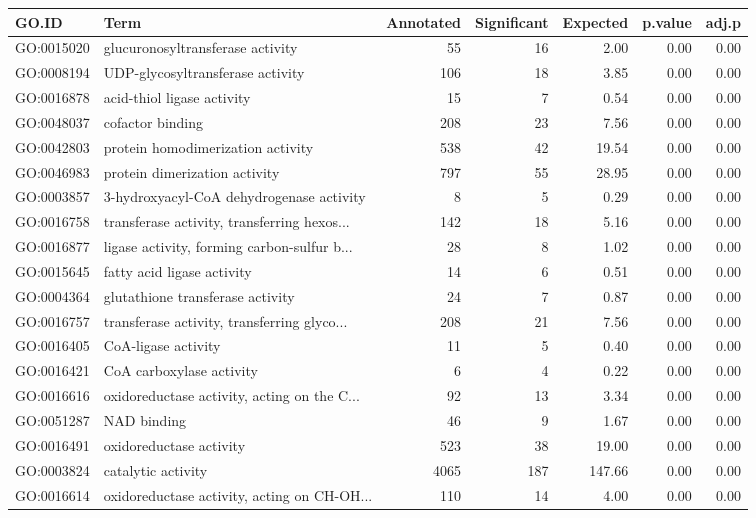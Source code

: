 \begin{table}[ht]
\centering
\begin{tabular}{llrrrrr}
  \hline
GO.ID & Term & Annotated & Significant & Expected & p.value & adj.p \\ 
  \hline
GO:0015020 & glucuronosyltransferase activity &  55 &  16 & 2.00 & 0.00 & 0.00 \\ 
  GO:0008194 & UDP-glycosyltransferase activity & 106 &  18 & 3.85 & 0.00 & 0.00 \\ 
  GO:0016878 & acid-thiol ligase activity &  15 &   7 & 0.54 & 0.00 & 0.00 \\ 
  GO:0048037 & cofactor binding & 208 &  23 & 7.56 & 0.00 & 0.00 \\ 
  GO:0042803 & protein homodimerization activity & 538 &  42 & 19.54 & 0.00 & 0.00 \\ 
  GO:0046983 & protein dimerization activity & 797 &  55 & 28.95 & 0.00 & 0.00 \\ 
  GO:0003857 & 3-hydroxyacyl-CoA dehydrogenase activity &   8 &   5 & 0.29 & 0.00 & 0.00 \\ 
  GO:0016758 & transferase activity, transferring hexos... & 142 &  18 & 5.16 & 0.00 & 0.00 \\ 
  GO:0016877 & ligase activity, forming carbon-sulfur b... &  28 &   8 & 1.02 & 0.00 & 0.00 \\ 
  GO:0015645 & fatty acid ligase activity &  14 &   6 & 0.51 & 0.00 & 0.00 \\ 
  GO:0004364 & glutathione transferase activity &  24 &   7 & 0.87 & 0.00 & 0.00 \\ 
  GO:0016757 & transferase activity, transferring glyco... & 208 &  21 & 7.56 & 0.00 & 0.00 \\ 
  GO:0016405 & CoA-ligase activity &  11 &   5 & 0.40 & 0.00 & 0.00 \\ 
  GO:0016421 & CoA carboxylase activity &   6 &   4 & 0.22 & 0.00 & 0.00 \\ 
  GO:0016616 & oxidoreductase activity, acting on the C... &  92 &  13 & 3.34 & 0.00 & 0.00 \\ 
  GO:0051287 & NAD binding &  46 &   9 & 1.67 & 0.00 & 0.00 \\ 
  GO:0016491 & oxidoreductase activity & 523 &  38 & 19.00 & 0.00 & 0.00 \\ 
  GO:0003824 & catalytic activity & 4065 & 187 & 147.66 & 0.00 & 0.00 \\ 
  GO:0016614 & oxidoreductase activity, acting on CH-OH... & 110 &  14 & 4.00 & 0.00 & 0.00 \\ 

\end{tabular}
\end{table}
